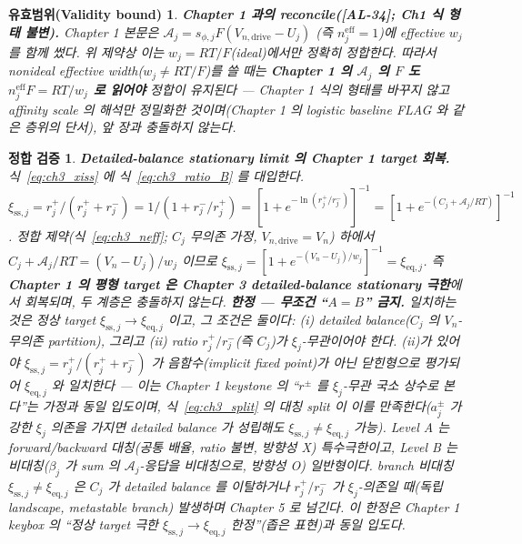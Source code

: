 \documentclass[11pt,a4paper]{article}
\newtheorem*{boundbox}{유효범위(Validity bound)}
\newtheorem*{verifybox}{정합 검증}
\newcommand{\eff}{\mathrm{eff}}
\newcommand{\eq}{\mathrm{eq}}
\newcommand{\drive}{\mathrm{drive}}
\newcommand{\sstat}{\mathrm{ss}}
\newcommand{\AL}[1]{\textsf{[AL-#1]}}
\begin{document}
\begin{boundbox}
\textbf{Chapter 1 과의 reconcile(\AL{34}; Ch1 식 형태 불변).} Chapter 1 본문은 $\mathcal A_j=s_{\phi,j}F(V_{n,\drive}-U_j)$
(즉 $n_j^{\eff}=1$)에 \emph{effective} $w_j$ 를 함께 썼다. 위 제약상 이는 $w_j=RT/F$(ideal)에서만 정확히
정합한다. 따라서 nonideal effective width($w_j\ne RT/F$)를 쓸 때는 \textbf{Chapter 1 의 $\mathcal A_j$ 의 $F$ 도
$n_j^{\eff}F=RT/w_j$ 로 읽어야} 정합이 유지된다 — Chapter 1 식의 \emph{형태}를 바꾸지 않고 affinity scale 의
\emph{해석}만 정밀화한 것이며(Chapter 1 의 logistic baseline FLAG 와 같은 층위의 단서), 앞 장과 충돌하지 않는다.
\end{boundbox}

\begin{verifybox}
\textbf{Detailed-balance stationary limit 의 Chapter 1 target 회복.} 식~\eqref{eq:ch3_xiss} 에
식~\eqref{eq:ch3_ratio_B} 를 대입한다. $\xi_{\sstat,j}=r_j^+/(r_j^++r_j^-)=1/(1+r_j^-/r_j^+)=[1+e^{-\ln(r_j^+/r_j^-)}]^{-1}
=[1+e^{-(C_j+\mathcal A_j/RT)}]^{-1}$. 정합 제약(식~\eqref{eq:ch3_neff}; $C_j$ 무의존 가정, $V_{n,\drive}=V_n$)
하에서 $C_j+\mathcal A_j/RT=(V_n-U_j)/w_j$ 이므로 $\xi_{\sstat,j}=[1+e^{-(V_n-U_j)/w_j}]^{-1}=\xi_{\eq,j}$. 즉
\textbf{Chapter 1 의 평형 target 은 Chapter 3 detailed-balance \emph{stationary 극한}}에서 회복되며, 두 계층은 충돌하지
않는다. \textbf{한정 — 무조건 ``$A=B$'' 금지.} 일치하는 것은 \emph{정상 target}
$\xi_{\sstat,j}\to\xi_{\eq,j}$ 이고, 그 조건은 \emph{둘}이다: (i) detailed balance($C_j$ 의 $V_n$-무의존 partition),
\emph{그리고} (ii) ratio $r_j^+/r_j^-$(즉 $C_j$)가 $\xi_j$\emph{-무관}이어야 한다. (ii)가 있어야 $\xi_{\sstat,j}=
r_j^+/(r_j^++r_j^-)$ 가 음함수(implicit fixed point)가 아닌 \emph{닫힌형}으로 평가되어 $\xi_{\eq,j}$ 와 일치한다
— 이는 Chapter 1 keystone 의 ``$r^\pm$ 를 $\xi_j$-무관 국소 상수로 본다''는 가정과 \emph{동일 입도}이며,
식~\eqref{eq:ch3_split} 의 대칭 split 이 이를 만족한다($a_j^\pm$ 가 강한 $\xi_j$ 의존을 가지면 detailed balance 가
성립해도 $\xi_{\sstat,j}\ne\xi_{\eq,j}$ 가능). Level A 는 forward/backward \emph{대칭}(공통 배율, ratio 불변,
방향성 X) 특수극한이고, Level B 는 \emph{비대칭}($\beta_j$ 가 sum 의 $\mathcal A_j$-응답을 비대칭으로, 방향성 O)
일반형이다. branch 비대칭 $\xi_{\sstat,j}\ne\xi_{\eq,j}$ 은 $C_j$ 가 detailed balance 를 이탈하거나 $r_j^+/r_j^-$ 가
$\xi_j$-의존일 때(독립 landscape, metastable branch) 발생하며 Chapter 5 로 넘긴다. 이 한정은
Chapter 1 keybox 의 ``정상 target 극한 $\xi_{\sstat,j}\to\xi_{\eq,j}$ 한정''(좁은 표현)과 \emph{동일 입도}다.
\end{verifybox}
\end{document}
